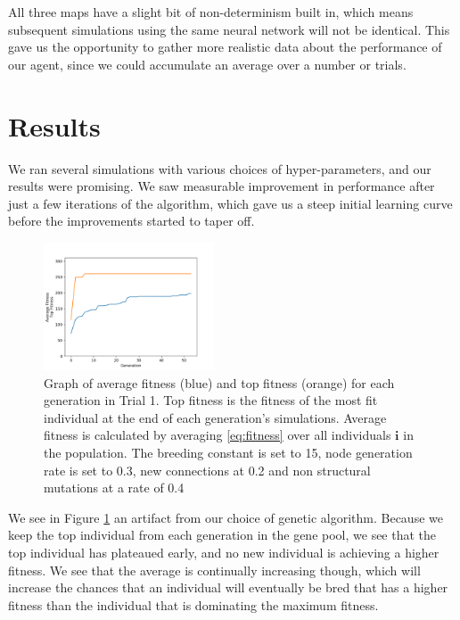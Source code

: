 \documentclass{article}
\begin{document}
\begin{multicols}{2}
All three maps have a slight bit of non-determinism built in, which means
subsequent simulations using the same neural network will not be identical. This
gave us the opportunity to gather more realistic data about the performance of
our agent, since we could accumulate an average over a number or trials.

\section{Results} We ran several simulations with various choices of
hyper-parameters, and our results were promising. We saw measurable improvement
in performance after just a few iterations of the algorithm, which gave us a
steep initial learning curve before the improvements started to taper off.

\begin{figure}[H]\label{fig:fitness graph}
\centering
\includegraphics[width=0.45\textwidth]{fig_1}
\begin{changemargin}{0.15in}{0.15in}
  \caption{Graph of average fitness (blue) and top fitness (orange) for each
    generation in Trial 1. Top fitness is the fitness of the most fit individual
    at the end of each generation's simulations. Average fitness is calculated
    by averaging \eqref{eq:fitness} over all individuals $\bm{i}$ in the
    population. The breeding constant is set to 15, node generation rate is set
    to 0.3, new connections at 0.2 and non structural mutations at a rate of
    0.4}
\end{changemargin}
\end{figure}

We see in Figure \ref{fig:fitness graph} an artifact from our choice of genetic
algorithm. Because we keep the top individual from each generation in the gene
pool, we see that the top individual has plateaued early, and no new individual
is achieving a higher fitness. We see that the average is continually increasing
though, which will increase the chances that an individual will eventually be
bred that has a higher fitness than the individual that is dominating the
maximum fitness.


\end{multicols}
\end{document}
